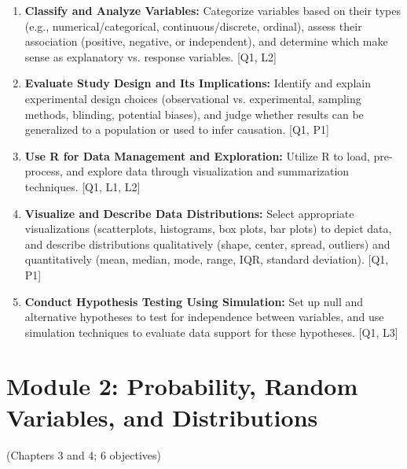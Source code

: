 \documentclass[12pt]{article}
\begin{document}

\begin{enumerate}
    \item \textbf{Classify and Analyze Variables:} Categorize variables based on their types (e.g., numerical/categorical, continuous/discrete, ordinal), assess their association (positive, negative, or independent), and determine which make sense as explanatory vs. response variables. [Q1, L2]
    \item \textbf{Evaluate Study Design and Its Implications:} Identify and explain experimental design choices (observational vs. experimental, sampling methods, blinding, potential biases), and judge whether results can be generalized to a population or used to infer causation. [Q1, P1]
    \item \textbf{Use R for Data Management and Exploration:} Utilize R to load, pre-process, and explore data through visualization and summarization techniques. [Q1, L1, L2]
    \item \textbf{Visualize and Describe Data Distributions:} Select appropriate visualizations (scatterplots, histograms, box plots, bar plots) to depict data, and describe distributions qualitatively (shape, center, spread, outliers) and quantitatively (mean, median, mode, range, IQR, standard deviation). [Q1, P1]
    \item \textbf{Conduct Hypothesis Testing Using Simulation:} Set up null and alternative hypotheses to test for independence between variables, and use simulation techniques to evaluate data support for these hypotheses. [Q1, L3]
\end{enumerate}

\newpage


\section{Module 2: Probability, Random Variables, and Distributions}
(Chapters 3 and 4; 6 objectives)

\end{document}
